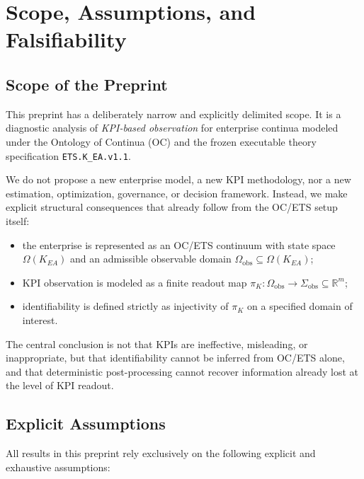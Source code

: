 ﻿\section{Scope, Assumptions, and Falsifiability}
\label{sec:scope-falsifiability}

\subsection{Scope of the Preprint}

This preprint has a deliberately narrow and explicitly delimited scope.
It is a diagnostic analysis of \emph{KPI-based observation} for enterprise
continua modeled under the Ontology of Continua (OC) and the frozen executable
theory specification \texttt{ETS.K\_EA.v1.1}.

We do not propose a new enterprise model, a new KPI methodology, nor a new
estimation, optimization, governance, or decision framework.
Instead, we make explicit structural consequences that already follow from the
OC/ETS setup itself:

\begin{itemize}[leftmargin=2em]
  \item the enterprise is represented as an OC/ETS continuum with state space
        \(\Omega(K_{EA})\) and an admissible observable domain
        \(\Omega_{\mathrm{obs}}\subseteq\Omega(K_{EA})\);
  \item KPI observation is modeled as a finite readout map
        \(\pi_K:\Omega_{\mathrm{obs}}\to\Sigma_{\mathrm{obs}}\subseteq\mathbb{R}^m\);
  \item identifiability is defined strictly as injectivity of \(\pi_K\) on a
        specified domain of interest.
\end{itemize}

The central conclusion is not that KPIs are ineffective, misleading, or
inappropriate, but that identifiability cannot be inferred from OC/ETS alone,
and that deterministic post-processing cannot recover information already lost
at the level of KPI readout.

\subsection{Explicit Assumptions}

All results in this preprint rely exclusively on the following explicit and
exhaustive assumptions:

